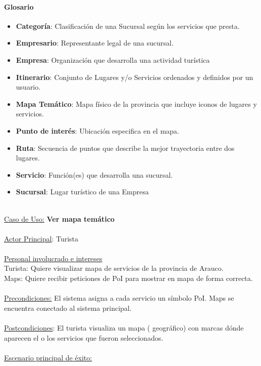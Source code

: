 \documentclass[12pt]{article}
\begin{document}
\paragraph{Glosario}
\begin{itemize}
\item \textbf{Categoría}: Clasificación  de una Sucursal según los servicios que presta.
\item \textbf{Empresario}: Representante legal de una sucursal.

\item \textbf{Empresa}: Organización que desarrolla una actividad turística

\item \textbf{Itinerario}: Conjunto de Lugares y/o Servicios ordenados y definidos por un usuario.

\item \textbf{Mapa Temático}: Mapa físico de la provincia que incluye iconos de lugares y servicios.

\item \textbf{Punto de interés}: Ubicación especifica en el mapa. 

\item \textbf{Ruta}: Secuencia de puntos que describe la mejor trayectoria entre dos lugares.

\item \textbf{Servicio}: Función(es) que desarrolla una sucursal.

\item \textbf{Sucursal}: Lugar turístico de una Empresa\\\\
\end{itemize}
\underline{Caso de Uso:} \textbf{Ver mapa temático}\\\\\underline{Actor Principal}: Turista\\\\\underline{Personal involucrado e intereses}\\Turista: Quiere visualizar mapa de servicios de la provincia de Arauco.\\
Maps: Quiere recibir peticiones de PoI para mostrar en mapa de forma correcta.\\\\\underline{Precondiciones:} El sistema asigna a cada servicio un símbolo PoI.
Maps se encuentra conectado al sistema principal.\\\\\underline{Postcondiciones}: El turista visualiza un mapa ( geográfico) con marcas dónde aparecen el o los servicios que fueron seleccionados.\\\\\underline{Escenario principal de éxito:}
\end{document}
